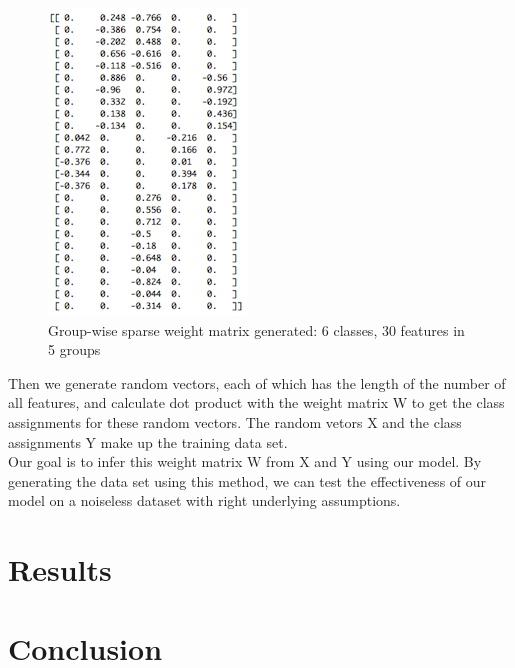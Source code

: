 \documentclass[11pt]{article}
\begin{document}
\begin{figure}[ht]
\begin{center}
	\includegraphics[natwidth=200, natheight=306]{m_img}
	\caption{Group-wise sparse weight matrix generated: 6 classes, 30 features in 5 groups}
\end{center}
\end{figure}

Then we generate random vectors, each of which has the length of the number of all features, and calculate dot product with the weight matrix W to get the class assignments for these random vectors. The random vetors X and the class assignments Y make up the training data set. \\

Our goal is to infer this weight matrix W from X and Y using our model. By generating the data set using this method, we can test the effectiveness of our model on a noiseless dataset with right underlying assumptions.\\ 


\section{Results}

\section{Conclusion}
%
%
\end{document}
